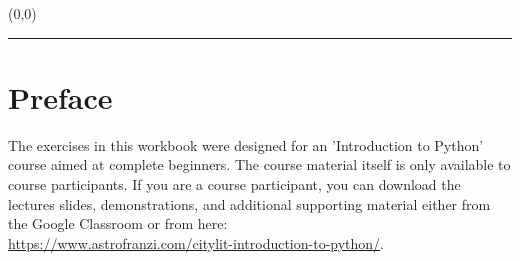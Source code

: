 \documentclass[
  12pt,					%
  a4paper,				%
  twoside,				%
]{report}
\begin{document}

\thispagestyle{empty}


\begin{textblock}{1}(0,0)
    \noindent\textcolor{titleBackground}{\rule{\paperwidth}{.45\paperheight}}
\end{textblock}



{}
{}


{}
{}
{}





\newpage




\thispagestyle{plain}

\tableofcontents

\clearpage
\newpage










\chapter{Preface}
The exercises in this workbook were designed for an 'Introduction to Python' course aimed at complete beginners. The course material itself is only available to course participants. If you are a course participant, you can download the lectures slides, demonstrations, and additional supporting material either from the Google Classroom or from here:\\ \url{https://www.astrofranzi.com/citylit-introduction-to-python/}.\\
\end{document}
